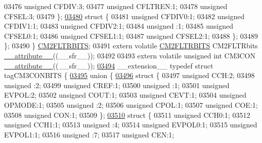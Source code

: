 \begin{DoxyCode}
03476       \textcolor{keywordtype}{unsigned} CFDIV:3;
03477       \textcolor{keywordtype}{unsigned} CFLTREN:1;
03478       \textcolor{keywordtype}{unsigned} CFSEL:3;
03479     \};
\hypertarget{a00009_source_l03480}{}\hyperlink{a00009}{03480}     \textcolor{keyword}{struct }\{
03481       \textcolor{keywordtype}{unsigned} CFDIV0:1;
03482       \textcolor{keywordtype}{unsigned} CFDIV1:1;
03483       \textcolor{keywordtype}{unsigned} CFDIV2:1;
03484       \textcolor{keywordtype}{unsigned} :1;
03485       \textcolor{keywordtype}{unsigned} CFSEL0:1;
03486       \textcolor{keywordtype}{unsigned} CFSEL1:1;
03487       \textcolor{keywordtype}{unsigned} CFSEL2:1;
03488     \};
03489   \};
03490 \} \hyperlink{a00008_d7/df2/a00312}{CM2FLTRBITS};
03491 \textcolor{keyword}{extern} \textcolor{keyword}{volatile} \hyperlink{a00008_d7/df2/a00312}{CM2FLTRBITS} CM2FLTRbits \hyperlink{a00009_a493c46f03454991ccc5aa7a6e1dfb2a7}{\_\_attribute\_\_}((\_\_sfr\_\_));
03492 
03493 \textcolor{keyword}{extern} \textcolor{keyword}{volatile} \textcolor{keywordtype}{unsigned} \textcolor{keywordtype}{int}  CM3CON \hyperlink{a00009_a493c46f03454991ccc5aa7a6e1dfb2a7}{\_\_attribute\_\_}((\_\_sfr\_\_));
\hypertarget{a00009_source_l03494}{}\hyperlink{a00009}{03494} \_\_extension\_\_ \textcolor{keyword}{typedef} \textcolor{keyword}{struct }tagCM3CONBITS \{
\hypertarget{a00009_source_l03495}{}\hyperlink{a00009}{03495}   \textcolor{keyword}{union }\{
\hypertarget{a00009_source_l03496}{}\hyperlink{a00009}{03496}     \textcolor{keyword}{struct }\{
03497       \textcolor{keywordtype}{unsigned} CCH:2;
03498       \textcolor{keywordtype}{unsigned} :2;
03499       \textcolor{keywordtype}{unsigned} CREF:1;
03500       \textcolor{keywordtype}{unsigned} :1;
03501       \textcolor{keywordtype}{unsigned} EVPOL:2;
03502       \textcolor{keywordtype}{unsigned} COUT:1;
03503       \textcolor{keywordtype}{unsigned} CEVT:1;
03504       \textcolor{keywordtype}{unsigned} OPMODE:1;
03505       \textcolor{keywordtype}{unsigned} :2;
03506       \textcolor{keywordtype}{unsigned} CPOL:1;
03507       \textcolor{keywordtype}{unsigned} COE:1;
03508       \textcolor{keywordtype}{unsigned} CON:1;
03509     \};
\hypertarget{a00009_source_l03510}{}\hyperlink{a00009}{03510}     \textcolor{keyword}{struct }\{
03511       \textcolor{keywordtype}{unsigned} CCH0:1;
03512       \textcolor{keywordtype}{unsigned} CCH1:1;
03513       \textcolor{keywordtype}{unsigned} :4;
03514       \textcolor{keywordtype}{unsigned} EVPOL0:1;
03515       \textcolor{keywordtype}{unsigned} EVPOL1:1;
03516       \textcolor{keywordtype}{unsigned} :7;
03517       \textcolor{keywordtype}{unsigned} CEN:1;

\end{DoxyCode}
